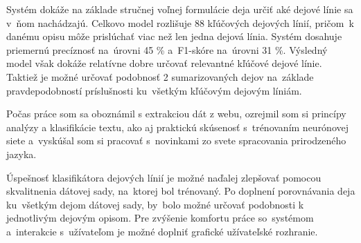 Systém dokáže na základe stručnej voľnej formulácie deja určiť aké dejové línie sa v~ňom nachádzajú. Celkovo model rozlišuje 88 kľúčových dejových línií, pričom~k danému opisu môže prislúchať viac než len jedna dejová línia. Systém dosahuje priemernú precíznosť na~úrovni 45 \% a~F1-skóre na~úrovni 31 \%. Výsledný model však dokáže relatívne dobre určovať relevantné kľúčové dejové línie. Taktiež je možné určovať podobnosť 2 sumarizovaných dejov na~základe pravdepodobností príslušnosti ku~všetkým kľúčovým dejovým líniám.

Počas práce som sa oboznámil s extrakciou dát z webu, ozrejmil som si princípy analýzy a klasifikácie textu, ako aj praktickú skúsenosť s~trénovaním neurónovej siete a~vyskúšal som si pracovať s~novinkami zo svete spracovania prirodzeného jazyka. 

Úspešnosť klasifikátora dejových línií je možné naďalej zlepšovať pomocou skvalitnenia dátovej sady, na~ktorej bol trénovaný. Po doplnení porovnávania deja ku~všetkým dejom dátovej sady, by~bolo možné určovať podobnosti k jednotlivým dejovým opisom. Pre zvýšenie komfortu práce so~systémom a~interakcie s~užívateľom je možné doplniť grafické užívateľské rozhranie.